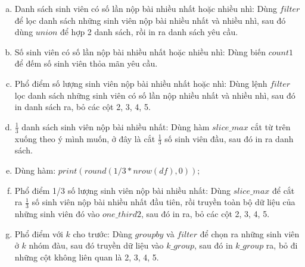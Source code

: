 \documentclass[a4paper]{article}
\theoremstyle{definition}
\begin{document}
\begin{enumerate}[a)]
    \item Danh sách sinh viên có số lần nộp bài nhiều nhất hoặc nhiều nhì: Dùng $filter$ để lọc danh sách những sinh viên nộp bài nhiều nhất và nhiều nhì, sau đó dùng $union$ để hợp 2 danh sách, rồi in ra danh sách yêu cầu. 
    \item Số sinh viên có số lần nộp bài nhiều nhất hoặc nhiều nhì: Dùng biến $count1$ để đếm số sinh viên thỏa mãn yêu cầu.
    \item Phổ điểm số lượng sinh viên nộp bài nhiều nhất hoặc nhì: Dùng lệnh $filter$ lọc danh sách những sinh viên có số lần nộp nhiều nhất và nhiều nhì, sau đó in danh sách ra, bỏ các cột 2, 3, 4, 5.
    \item $\frac{1}{3}$ danh sách sinh viên nộp bài nhiều nhất: Dùng hàm $slice\_max$ cắt từ trên xuống theo ý mình muốn, ở đây là cắt $\frac{1}{3}$ số sinh viên đầu, sau đó in ra danh sách.
    \item Dùng hàm: $print(round(1/3*nrow(df), 0));$
    \item Phổ điểm 1/3 số lượng sinh viên nộp bài nhiều nhất: Dùng $slice\_max$ để cắt ra $\frac{1}{3}$ số sinh viên nộp bài nhiều nhất đầu tiên, rồi truyền toàn bộ dữ liệu của những sinh viên đó vào $one\_third2$, sau đó in ra, bỏ các cột 2, 3, 4, 5.
    \item Phổ điểm với $k$ cho trước: Dùng $groupby$ và $filter$ để chọn ra những sinh viên ở $k$ nhóm đàu, sau đó truyền dữ liệu vào $k\_group$, sau đó in $k\_group$ ra, bỏ đi những cột không liên quan là 2, 3, 4, 5.
    
\end{enumerate}
\end{document}
